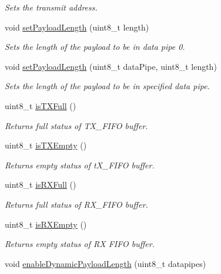 \begin{DoxyCompactItemize}
\begin{DoxyCompactList}\small\item\em Sets the transmit address. \end{DoxyCompactList}\item 
void \hyperlink{classn_r_f24_l01_ac6558318d4e55b6a79f2796047f0d9fe}{set\-Payload\-Length} (uint8\-\_\-t length)
\begin{DoxyCompactList}\small\item\em Sets the length of the payload to be in data pipe 0. \end{DoxyCompactList}\item 
void \hyperlink{classn_r_f24_l01_a467c306a3f9fa0e394cc30b8d8b53e3e}{set\-Payload\-Length} (uint8\-\_\-t data\-Pipe, uint8\-\_\-t length)
\begin{DoxyCompactList}\small\item\em Sets the length of the payload to be in specified data pipe. \end{DoxyCompactList}\item 
uint8\-\_\-t \hyperlink{classn_r_f24_l01_a6139cb9b9c20430ac13a5de9811d916f}{is\-T\-X\-Full} ()
\begin{DoxyCompactList}\small\item\em Returns full status of T\-X\-\_\-\-F\-I\-F\-O buffer. \end{DoxyCompactList}\item 
uint8\-\_\-t \hyperlink{classn_r_f24_l01_ab5876a6b80e5e9fade8b8d5a7985913e}{is\-T\-X\-Empty} ()
\begin{DoxyCompactList}\small\item\em Returns empty status of t\-X\-\_\-\-F\-I\-F\-O buffer. \end{DoxyCompactList}\item 
uint8\-\_\-t \hyperlink{classn_r_f24_l01_aaefd1ad94f4b27f9fa957bce03e96a16}{is\-R\-X\-Full} ()
\begin{DoxyCompactList}\small\item\em Returns full status of R\-X\-\_\-\-F\-I\-F\-O buffer. \end{DoxyCompactList}\item 
uint8\-\_\-t \hyperlink{classn_r_f24_l01_a140024e311c9b64aeb381bb6076059b1}{is\-R\-X\-Empty} ()
\begin{DoxyCompactList}\small\item\em Returns empty status of R\-X F\-I\-F\-O buffer. \end{DoxyCompactList}\item 
void \hyperlink{classn_r_f24_l01_ae0d0977ad5ed69d14ed41e3ab10652e1}{enable\-Dynamic\-Payload\-Length} (uint8\-\_\-t datapipes)

\end{DoxyCompactItemize}
